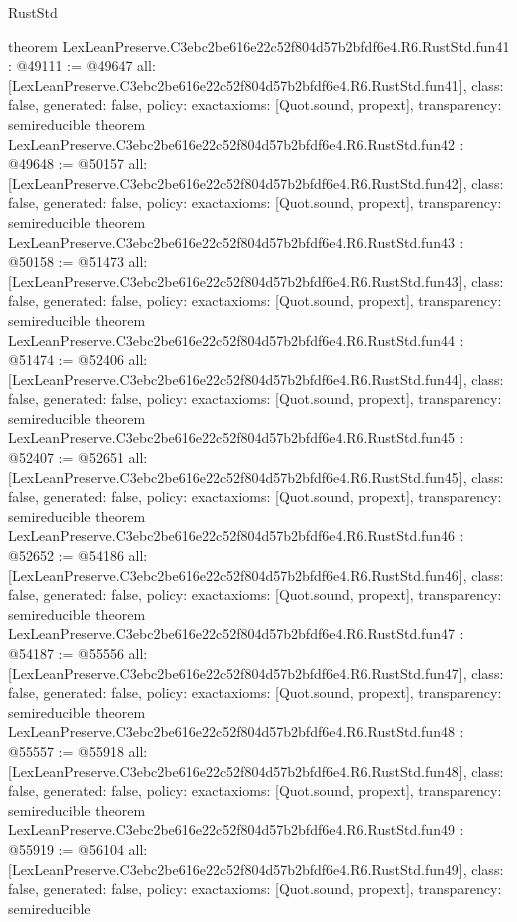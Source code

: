 \begin{lexlean}{RustStd}
\begin{coremodule}
{}
theorem LexLeanPreserve.C3ebc2be616e22c52f804d57b2bfdf6e4.R6.RustStd.fun41 : @49111 := @49647 {
  all: [LexLeanPreserve.C3ebc2be616e22c52f804d57b2bfdf6e4.R6.RustStd.fun41],
  class: false,
  generated: false,
  policy: exact{axioms: [Quot.sound, propext]},
  transparency: semireducible
}
theorem LexLeanPreserve.C3ebc2be616e22c52f804d57b2bfdf6e4.R6.RustStd.fun42 : @49648 := @50157 {
  all: [LexLeanPreserve.C3ebc2be616e22c52f804d57b2bfdf6e4.R6.RustStd.fun42],
  class: false,
  generated: false,
  policy: exact{axioms: [Quot.sound, propext]},
  transparency: semireducible
}
theorem LexLeanPreserve.C3ebc2be616e22c52f804d57b2bfdf6e4.R6.RustStd.fun43 : @50158 := @51473 {
  all: [LexLeanPreserve.C3ebc2be616e22c52f804d57b2bfdf6e4.R6.RustStd.fun43],
  class: false,
  generated: false,
  policy: exact{axioms: [Quot.sound, propext]},
  transparency: semireducible
}
theorem LexLeanPreserve.C3ebc2be616e22c52f804d57b2bfdf6e4.R6.RustStd.fun44 : @51474 := @52406 {
  all: [LexLeanPreserve.C3ebc2be616e22c52f804d57b2bfdf6e4.R6.RustStd.fun44],
  class: false,
  generated: false,
  policy: exact{axioms: [Quot.sound, propext]},
  transparency: semireducible
}
theorem LexLeanPreserve.C3ebc2be616e22c52f804d57b2bfdf6e4.R6.RustStd.fun45 : @52407 := @52651 {
  all: [LexLeanPreserve.C3ebc2be616e22c52f804d57b2bfdf6e4.R6.RustStd.fun45],
  class: false,
  generated: false,
  policy: exact{axioms: [Quot.sound, propext]},
  transparency: semireducible
}
theorem LexLeanPreserve.C3ebc2be616e22c52f804d57b2bfdf6e4.R6.RustStd.fun46 : @52652 := @54186 {
  all: [LexLeanPreserve.C3ebc2be616e22c52f804d57b2bfdf6e4.R6.RustStd.fun46],
  class: false,
  generated: false,
  policy: exact{axioms: [Quot.sound, propext]},
  transparency: semireducible
}
theorem LexLeanPreserve.C3ebc2be616e22c52f804d57b2bfdf6e4.R6.RustStd.fun47 : @54187 := @55556 {
  all: [LexLeanPreserve.C3ebc2be616e22c52f804d57b2bfdf6e4.R6.RustStd.fun47],
  class: false,
  generated: false,
  policy: exact{axioms: [Quot.sound, propext]},
  transparency: semireducible
}
theorem LexLeanPreserve.C3ebc2be616e22c52f804d57b2bfdf6e4.R6.RustStd.fun48 : @55557 := @55918 {
  all: [LexLeanPreserve.C3ebc2be616e22c52f804d57b2bfdf6e4.R6.RustStd.fun48],
  class: false,
  generated: false,
  policy: exact{axioms: [Quot.sound, propext]},
  transparency: semireducible
}
theorem LexLeanPreserve.C3ebc2be616e22c52f804d57b2bfdf6e4.R6.RustStd.fun49 : @55919 := @56104 {
  all: [LexLeanPreserve.C3ebc2be616e22c52f804d57b2bfdf6e4.R6.RustStd.fun49],
  class: false,
  generated: false,
  policy: exact{axioms: [Quot.sound, propext]},
  transparency: semireducible
}
\end{coremodule}
\end{lexlean}
